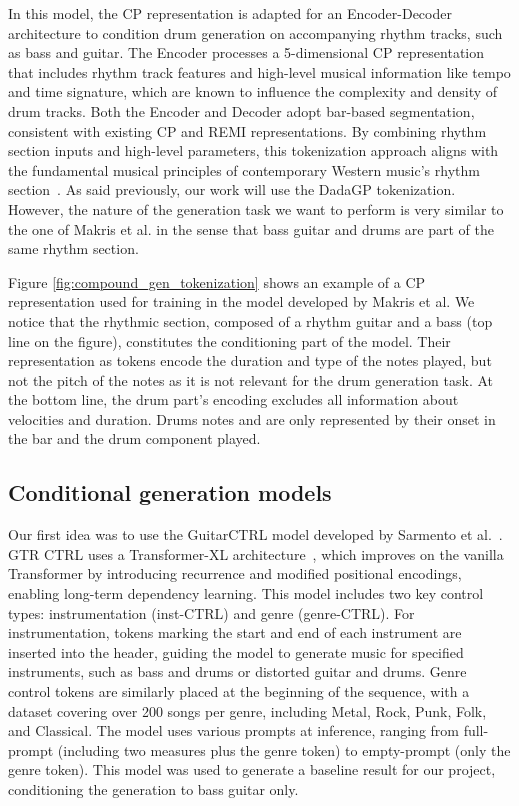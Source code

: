 In this model, the CP representation is adapted for an Encoder-Decoder architecture to condition drum generation on accompanying rhythm tracks, such as bass and guitar.
The Encoder processes a 5-dimensional CP representation that includes rhythm track features and high-level musical information like tempo and time signature, which are known to influence the complexity and density of drum tracks.
Both the Encoder and Decoder adopt bar-based segmentation, consistent with existing CP and REMI representations.
By combining rhythm section inputs and high-level parameters, this tokenization approach aligns with the fundamental musical principles of contemporary Western music's rhythm section~\cite{makris_conditional_2022}.
As said previously, our work will use the DadaGP tokenization. However, the nature of the generation task we want to perform is very similar to the one of Makris et al. in the sense that bass guitar and drums are part of the same rhythm section.


Figure \ref{fig:compound_gen_tokenization} shows an example of a CP representation used for training in the model developed by Makris et al.
We notice that the rhythmic section, composed of a rhythm guitar and a bass (top line on the figure), constitutes the conditioning part of the model.
Their representation as tokens encode the duration and type of the notes played, but not the pitch of the notes as it is not relevant for the drum generation task.
At the bottom line, the drum part's encoding excludes all information about velocities and duration.
Drums notes and are only represented by their onset in the bar and the drum component played.

\subsection{Conditional generation models}

Our first idea was to use the GuitarCTRL model developed by Sarmento et al.~\cite{sarmento_gtr-ctrl_2023}.
GTR CTRL uses a Transformer-XL architecture~\cite{dai_transformer-xl_2019}, which improves on the vanilla Transformer by introducing recurrence and modified positional encodings, enabling long-term dependency learning.
This model includes two key control types: instrumentation (inst-CTRL) and genre (genre-CTRL).
For instrumentation, tokens marking the start and end of each instrument are inserted into the header, guiding the model to generate music for specified instruments, such as bass and drums or distorted guitar and drums.
Genre control tokens are similarly placed at the beginning of the sequence, with a dataset covering over 200 songs per genre, including Metal, Rock, Punk, Folk, and Classical.
The model uses various prompts at inference, ranging from full-prompt (including two measures plus the genre token) to empty-prompt (only the genre token).
This model was used to generate a baseline result for our project, conditioning the generation to bass guitar only.


